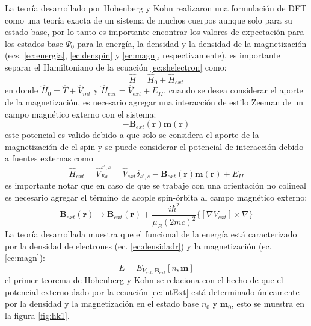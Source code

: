 \documentclass[12pt,a4paper, oneside]{book}
\begin{document}
  La teor\'ia desarrollado por Hohenberg y Kohn realizaron una formulaci\'on de DFT como una teor\'ia exacta de un sistema de muchos cuerpos aunque solo para su estado base, por lo tanto  es importante encontrar los valores de expectaci\'on para los estados base $\Psi_0$ para la energ\'ia, la densidad y la densidad de la magnetizaci\'on  (ecs. \ref{ec:energia}, \ref{ec:denspin} y \ref{ec:magn}, respectivamente), es importante separar el Hamiltoniano  de la ecuaci\'on \ref{ec:shelectron} como:
  \begin{equation}
  \hat{H} =\hat{H}_0 + \hat{H}_{ext} \label{ec:sepHamilton}
  \end{equation}
  en donde $\hat{H}_0 = \hat{T}+\hat{V}_{int}$ y $\hat{H}_{ext}= \hat{V}_{ext} + E_{II}$,  cuando se desea considerar el aporte de la magnetizaci\'on, es necesario agregar una interacci\'on de estilo Zeeman de un campo magn\'etico externo con el sistema:
  \begin{equation*}
  -\pmb{B}_{ext} (\pmb{r}) \pmb{m} (\pmb{r})
  \end{equation*}  
  este potencial es valido debido a que solo se considera el aporte de la magnetizaci\'on de el spin y se puede considerar el potencial de interacci\'on debido a fuentes externas como 
  \begin{equation}
  \hat{H}_{ext} = \hat{V}_{Ex}^{s', s} = \hat{V}_{ext} \delta_{s',s} - \pmb{B}_{ext} (\pmb{r}) \pmb{m} (\pmb{r}) +E_{II} \label{ec:intExt}
  \end{equation}
  es importante notar que en caso de que se trabaje con una orientaci\'on no colineal es necesario agregar el t\'ermino de acople spin-\'orbita al campo magn\'etico externo:
  \begin{equation*}
  \pmb{B}_{ext} (\pmb{r}) \to  \pmb{B}_{ext} (\pmb{r}) + \frac{i \hbar^2}{\mu_{B} (2 m c)^2} \{[\nabla V_{ext}]\times \nabla \}
  \end{equation*}
  \newline
  La teor\'ia desarrollada muestra que el funcional de la energ\'ia est\'a caracterizado por la densidad de electrones (ec. \ref{ec:densidadr}) y la magnetizaci\'on (ec. \ref{ec:magn}):
  \begin{equation}
  E=E_{V_{ext}, \pmb{B}_{ext}} [n,\pmb{m}] \label{ec:func1}
  \end{equation}
  el primer teorema de Hohenberg y Kohn se relaciona con el hecho  de que el potencial externo dado por la ecuaci\'on \ref{ec:intExt}  est\'a determinado \'unicamente por la densidad y la magnetizaci\'on en el estado base $n_0$ y $\pmb{m}_0$, esto se muestra en la figura \ref{fig:hk1}.
\end{document}
